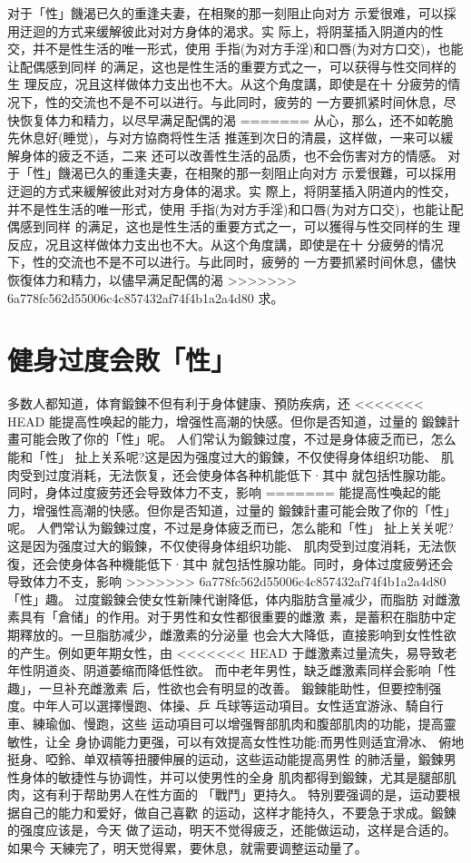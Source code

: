 \documentclass[12pt,UTF8]{ctexbook}
\begin{document}
对于「性」饑渴已久的重逢夫妻，在相聚的那一刻阻止向对方
示爱很难，可以採用迂迴的方式来缓解彼此对对方身体的渴求。实
际上，将阴茎插入阴道内的性交，并不是性生活的唯一形式，使用
手指(为对方手淫)和口唇(为对方口交)，也能让配偶感到同样
的满足，这也是性生活的重要方式之一，可以获得与性交同样的生
理反应，况且这样做体力支出也不大。从这个角度講，即使是在十
分疲劳的情况下，性的交流也不是不可以进行。与此同时，疲劳的
一方要抓紧时间休息，尽快恢复体力和精力，以尽早满足配偶的渴
=======
从心，那么，还不如乾脆先休息好(睡觉)，与对方協商将性生活
推莲到次日的清晨，这样做，一来可以緩解身体的疲乏不适，二来
还可以改善性生活的品质，也不会伤害对方的情感。
对于「性」饑渴已久的重逢夫妻，在相聚的那一刻阻止向对方
示爱很難，可以採用迂迴的方式来緩解彼此对对方身体的渴求。实
際上，将阴茎插入阴道内的性交，并不是性生活的唯一形式，使用
手指(为对方手淫)和口唇(为对方口交)，也能让配偶感到同样
的满足，这也是性生活的重要方式之一，可以獲得与性交同样的生
理反应，况且这样做体力支出也不大。从这个角度講，即使是在十
分疲勞的情况下，性的交流也不是不可以进行。与此同时，疲勞的
一方要抓紧时间休息，儘快恢復体力和精力，以儘早满足配偶的渴
>>>>>>> 6a778fc562d55006c4c857432af74f4b1a2a4d80
求。

\section{健身过度会敗「性」}

多数人都知道，体育鍛鍊不但有利于身体健康、預防疾病，还
<<<<<<< HEAD
能提高性唤起的能力，增强性高潮的快感。但你是否知道，过量的
鍛鍊計畫可能会敗了你的「性」呢。
人们常认为鍛鍊过度，不过是身体疲乏而已，怎么能和「性」
扯上关系呢?这是因为强度过大的鍛鍊，不仅使得身体组织功能、
肌肉受到过度消耗，无法恢复，还会使身体各种机能低下·其中
就包括性腺功能。同时，身体过度疲劳还会导致体力不支，影响
=======
能提高性喚起的能力，增强性高潮的快感。但你是否知道，过量的
鍛鍊計畫可能会敗了你的「性」呢。
人們常认为鍛鍊过度，不过是身体疲乏而已，怎么能和「性」
扯上关关呢?这是因为强度过大的鍛鍊，不仅使得身体组织功能、
肌肉受到过度消耗，无法恢復，还会使身体各种機能低下·其中
就包括性腺功能。同时，身体过度疲勞还会导致体力不支，影响
>>>>>>> 6a778fc562d55006c4c857432af74f4b1a2a4d80
「性」趣。
过度鍛鍊会使女性新陳代谢降低，体内脂肪含量减少，而脂肪
对雌激素具有「倉储」的作用。对于男性和女性都很重要的雌激
素，是蓄积在脂肪中定期釋放的。一旦脂肪减少，雌激素的分泌量
也会大大降低，直接影响到女性性欲的产生。例如更年期女性，由
<<<<<<< HEAD
于雌激素过量流失，易导致老年性阴道炎、阴道萎缩而降低性欲。
而中老年男性，缺乏雌激素同样会影响「性趣」，一旦补充雌激素
后，性欲也会有明显的改善。
鍛鍊能助性，但要控制强度。中年人可以選擇慢跑、体操、乒
乓球等运动項目。女性适宜游泳、騎自行車、練瑜伽、慢跑，这些
运动項目可以增强臀部肌肉和腹部肌肉的功能，提高靈敏性，让全
身协调能力更强，可以有效提高女性性功能:而男性则适宜滑冰、
俯地挺身、啞鈴、单双槓等扭腰伸展的运动，这些运动能提高男性
的肺活量，鍛鍊男性身体的敏捷性与协调性，并可以使男性的全身
肌肉都得到鍛鍊，尤其是腿部肌肉，这有利于帮助男人在性方面的
「戰鬥」更持久。
特別要强调的是，运动要根据自己的能力和爱好，做自己喜歡
的运动，这样才能持久，不要急于求成。鍛鍊的强度应该是，今天
做了运动，明天不觉得疲乏，还能做运动，这样是合适的。如果今
天練完了，明天觉得累，要休息，就需要调整运动量了。
\end{document}
